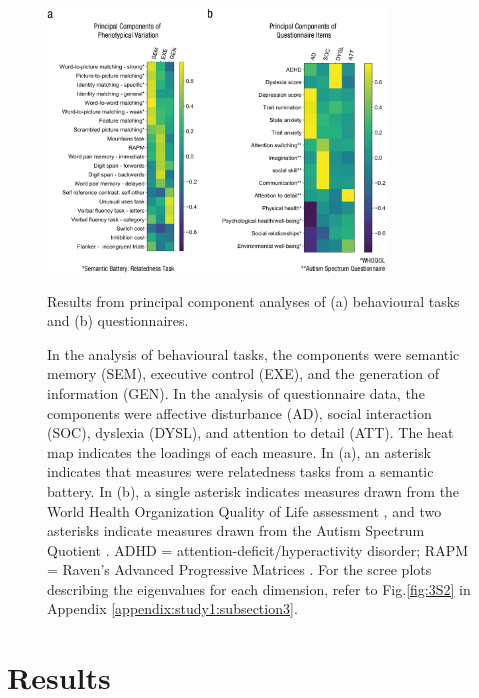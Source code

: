 \begin{figure}[p]
	\centering
	\includegraphics[width=0.8\textwidth]{study1/image/study1fig3.jpeg}
	\caption{Results from principal component analyses of (a) behavioural tasks and (b) questionnaires.}
	\caption*{In the analysis of behavioural tasks, the components were semantic memory (SEM), executive control (EXE), and the generation of information (GEN). In the analysis of questionnaire data, the components were affective disturbance (AD), social interaction (SOC), dyslexia (DYSL), and attention to detail (ATT). The heat map indicates the loadings of each measure. In (a), an asterisk indicates that measures were relatedness tasks from a semantic battery. In (b), a single asterisk indicates measures drawn from the World Health Organization Quality of Life assessment \cite{WHOQOL2002}, and two asterisks indicate measures drawn from the Autism Spectrum Quotient \cite{Baron-Cohen2001}. ADHD = attention-deficit/hyperactivity disorder; RAPM = Raven’s Advanced Progressive Matrices \cite{Raven1998}. For the scree plots describing the eigenvalues for each dimension, refer to Fig.\ref{fig:3S2} in Appendix \ref{appendix:study1:subsection3}.}
	\label{fig:study1:fig3}
\end{figure}

\section{Results}
\label{study1:results}

